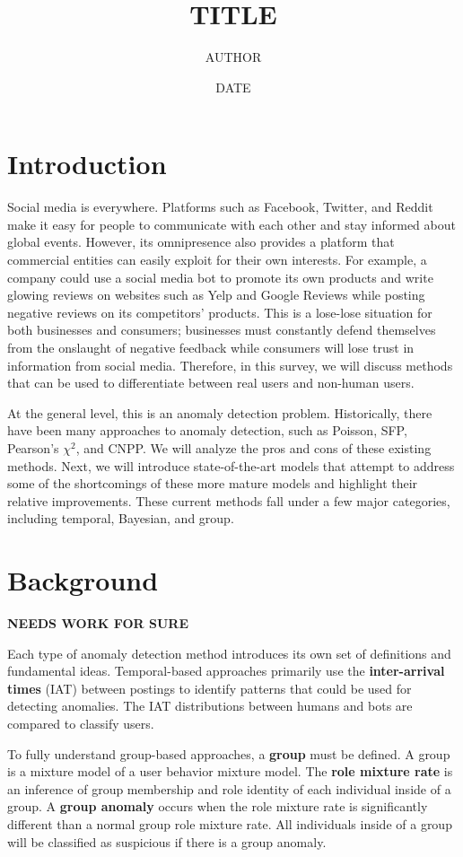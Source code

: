 \documentclass[11pt, oneside]{article}   	%
\title{TITLE}
\author{AUTHOR}
\date{DATE}							%
\begin{document}
\maketitle

\section*{Introduction}

\quad Social media is everywhere. 
Platforms such as Facebook, Twitter, and Reddit make it easy for people to communicate with each other and stay informed about global events.
However, its omnipresence also provides a platform that commercial entities can easily exploit for their own interests.
For example, a company could use a social media bot to promote its own products and write glowing reviews on websites such as Yelp and Google Reviews while posting negative reviews on its competitors' products.
This is a lose-lose situation for both businesses and consumers; businesses must constantly defend themselves from the onslaught of negative feedback while consumers will lose trust in information from social media.
Therefore, in this survey, we will discuss methods that can be used to differentiate between real users and non-human users.

\quad At the general level, this is an anomaly detection problem.
Historically, there have been many approaches to anomaly detection, such as Poisson, SFP, Pearson's $\chi^2$, and CNPP.
We will analyze the pros and cons of these existing methods.
Next, we will introduce state-of-the-art models that attempt to address some of the shortcomings of these more mature models and highlight their relative improvements. 
These current methods fall under a few major categories, including temporal, Bayesian, and group.

\section*{Background}

\textbf{NEEDS WORK FOR SURE}

\quad Each type of anomaly detection method introduces its own set of definitions and fundamental ideas.
Temporal-based approaches primarily use the \textbf{inter-arrival times} (IAT) between postings to identify patterns that could be used for detecting anomalies.
The IAT distributions between humans and bots are compared to classify users.

\quad To fully understand group-based approaches, a \textbf{group} must be defined.
A group is a mixture model of a user behavior mixture model.
The \textbf{role mixture rate} is an inference of group membership and role identity of each individual inside of a group.
A \textbf{group anomaly} occurs when the role mixture rate is significantly different than a normal group role mixture rate.
All individuals inside of a group will be classified as suspicious if there is a group anomaly.
\end{document}
